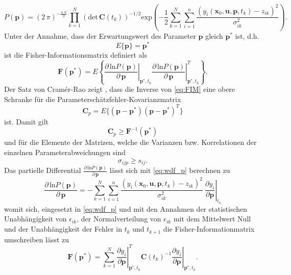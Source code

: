 \begin{equation}\label{eq:wdf_p}
P(\pmb{p}) = (2\, \pi)^{-\frac{n\,N}{2}}\prod^N_{k=1}\left(\mathrm{det}\,\pmb{C}(t_k)\right)^{-1/2}\mathrm{exp}\left(-\frac{1}{2}\sum^N_{k=1}\sum^n_{i=1}\frac{\left(y_i(\pmb{x}_0,\pmb{u},\pmb{p},t_k)-z_{ik}\right)^2}{\sigma^2_{ik}}\right).
\end{equation}
Unter der Annahme, dass der Erwartungswert des Parameter $\pmb{p}$ gleich $\pmb{p}^*$ ist, d.h. 
\begin{equation}
E\lbrace\pmb{p}\rbrace = \pmb{p}^*
\end{equation}
ist die Fisher-Informationsmatrix definiert als
\begin{equation}\label{eq:FIM}
\pmb{F}(\pmb{p}^*)=E\left\lbrace\left. \frac{\partial\,\mathrm{ln}P(\pmb{p})}{\partial\, \pmb{p}}\right|_{\pmb{p}^*,t_k} \left.\frac{\partial\,\mathrm{ln}P(\pmb{p})}{\partial\, \pmb{p}}\right|_{\pmb{p}^*,t_k}^T\right\rbrace.
\end{equation}
Der Satz von Cramér-Rao zeigt \cite{Goodwin.1977}, dass die Inverse von \eqref{eq:FIM} eine obere Schranke für die Parameterschätzfehler-Kovarianzmatrix 
\begin{equation}
\pmb{C}_p = E\lbrace(\pmb{p}-\pmb{p}^*)(\pmb{p}-\pmb{p}^*)^T\rbrace
\end{equation}
ist. Damit gilt
\begin{equation}
\pmb{C}_p \geq \pmb{F}^{-1}(\pmb{p}^*)
\end{equation}
und für die Elemente der Matrizen, welche die Varianzen bzw. Korrelationen der einzelnen Parameterabweichungen sind
\begin{equation}
\sigma_{ijp} \geq s_{ij}.
\end{equation}
Das partielle Differential $\frac{\partial\,\mathrm{ln}P(\pmb{p})}{\partial\, \pmb{p}}$ lässt sich mit \eqref{eq:wdf_p} berechnen zu 
\begin{equation}
\frac{\partial\,\mathrm{ln}P(\pmb{p})}{\partial\, \pmb{p}} = -\sum^N_{k=1}\sum^n_{i=1}\frac{\left(y_i(\pmb{x}_0,\pmb{u},\pmb{p},t_k)-z_{ik}\right)^2}{\sigma^2_{ik}}\ \left. \frac{\partial y_i}{\partial \pmb{p}}\right|_{t_k}
\end{equation}
womit sich, eingesetzt in \eqref{eq:wdf_p} und mit den Annahmen der statistischen Unabhängigkeit von $\epsilon_{ik}$, der Normalverteilung von $\epsilon_{ik}$ mit dem Mittelwert Null und der Unabhängigkeit der Fehler in $t_k$ und $t_{k+1}$ die Fisher-Informationmatrix umschreiben lässt zu  
\begin{equation}
\pmb{F}(\pmb{p}^*) = \sum_{k=1}^N \left. \frac{\partial y_i}{\partial \pmb{p}}\right|_{\pmb{p}^*,t_k}^T \pmb{C}(t_k)^{-1} \left.\frac{\partial y_i}{\partial \pmb{p}}\right|_{\pmb{p}^*,t_k}.
\end{equation}
